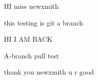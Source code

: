 \documentclass[a4 paper,12pt]{article}
\begin{document}
HI  miss newxmith

this testing is git a branch

HI I AM BACK

A-branch pull test　

thank you newxmith u r good
\end{document}
